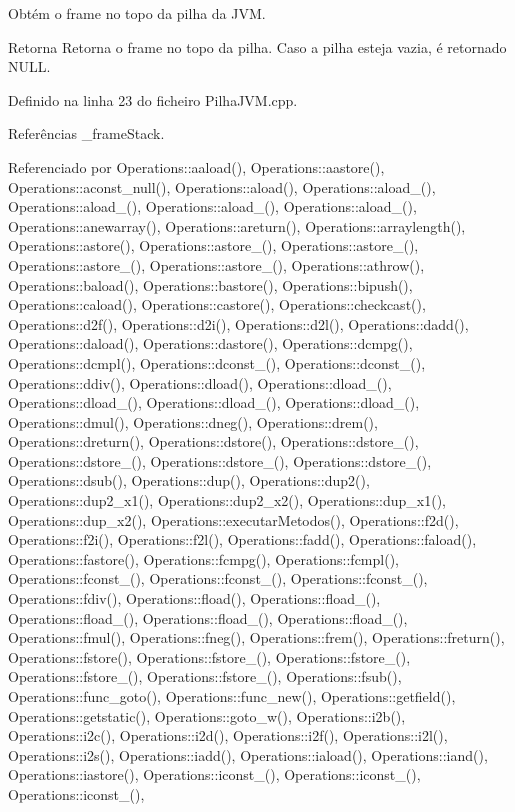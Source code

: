 Obtém o frame no topo da pilha da J\+VM. 

\begin{DoxyReturn}{Retorna}
Retorna o frame no topo da pilha. Caso a pilha esteja vazia, é retornado {\ttfamily N\+U\+LL}. 
\end{DoxyReturn}


Definido na linha 23 do ficheiro Pilha\+J\+V\+M.\+cpp.



Referências \+\_\+frame\+Stack.



Referenciado por Operations\+::aaload(), Operations\+::aastore(), Operations\+::aconst\+\_\+null(), Operations\+::aload(), Operations\+::aload\+\_(), Operations\+::aload\+\_(), Operations\+::aload\+\_(), Operations\+::aload\+\_(), Operations\+::anewarray(), Operations\+::areturn(), Operations\+::arraylength(), Operations\+::astore(), Operations\+::astore\+\_(), Operations\+::astore\+\_(), Operations\+::astore\+\_(), Operations\+::astore\+\_(), Operations\+::athrow(), Operations\+::baload(), Operations\+::bastore(), Operations\+::bipush(), Operations\+::caload(), Operations\+::castore(), Operations\+::checkcast(), Operations\+::d2f(), Operations\+::d2i(), Operations\+::d2l(), Operations\+::dadd(), Operations\+::daload(), Operations\+::dastore(), Operations\+::dcmpg(), Operations\+::dcmpl(), Operations\+::dconst\+\_(), Operations\+::dconst\+\_(), Operations\+::ddiv(), Operations\+::dload(), Operations\+::dload\+\_(), Operations\+::dload\+\_(), Operations\+::dload\+\_(), Operations\+::dload\+\_(), Operations\+::dmul(), Operations\+::dneg(), Operations\+::drem(), Operations\+::dreturn(), Operations\+::dstore(), Operations\+::dstore\+\_(), Operations\+::dstore\+\_(), Operations\+::dstore\+\_(), Operations\+::dstore\+\_(), Operations\+::dsub(), Operations\+::dup(), Operations\+::dup2(), Operations\+::dup2\+\_\+x1(), Operations\+::dup2\+\_\+x2(), Operations\+::dup\+\_\+x1(), Operations\+::dup\+\_\+x2(), Operations\+::executar\+Metodos(), Operations\+::f2d(), Operations\+::f2i(), Operations\+::f2l(), Operations\+::fadd(), Operations\+::faload(), Operations\+::fastore(), Operations\+::fcmpg(), Operations\+::fcmpl(), Operations\+::fconst\+\_(), Operations\+::fconst\+\_(), Operations\+::fconst\+\_(), Operations\+::fdiv(), Operations\+::fload(), Operations\+::fload\+\_(), Operations\+::fload\+\_(), Operations\+::fload\+\_(), Operations\+::fload\+\_(), Operations\+::fmul(), Operations\+::fneg(), Operations\+::frem(), Operations\+::freturn(), Operations\+::fstore(), Operations\+::fstore\+\_(), Operations\+::fstore\+\_(), Operations\+::fstore\+\_(), Operations\+::fstore\+\_(), Operations\+::fsub(), Operations\+::func\+\_\+goto(), Operations\+::func\+\_\+new(), Operations\+::getfield(), Operations\+::getstatic(), Operations\+::goto\+\_\+w(), Operations\+::i2b(), Operations\+::i2c(), Operations\+::i2d(), Operations\+::i2f(), Operations\+::i2l(), Operations\+::i2s(), Operations\+::iadd(), Operations\+::iaload(), Operations\+::iand(), Operations\+::iastore(), Operations\+::iconst\+\_(), Operations\+::iconst\+\_(), Operations\+::iconst\+\_(), 
